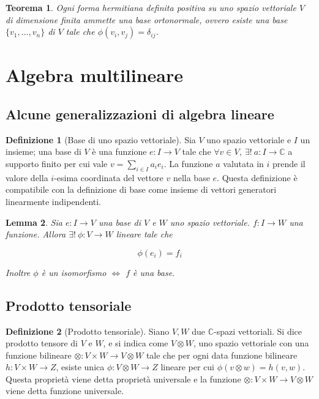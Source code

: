 \documentclass[11pt]{article}
\theoremstyle{plain}
\newtheorem{thm}{Teorema}[section]
\newtheorem{lemma}[thm]{Lemma}
\theoremstyle{definition}
\newtheorem{defn}{Definizione}[section]
\theoremstyle{remark}
\begin{document}
\begin{thm}
	Ogni forma hermitiana definita positiva su uno spazio vettoriale $V$ di dimensione finita ammette una \textit{base ortonormale}, ovvero esiste una base $\{v_1,\ldots,v_n\}$ di $V$ tale che $\phi(v_i,v_j)=\delta_{ij}$. 
\end{thm}




\newpage
\section{Algebra multilineare}
\subsection{Alcune generalizzazioni di algebra lineare}

\begin{defn}[Base di uno spazio vettoriale]
Sia $V$ uno spazio vettoriale e $I$ un insieme; una base di $V$ è una funzione $e: I \to V$ tale che 
$\forall v \in V,\  \exists!\  a: I \to \mathbb{C}$ a supporto finito per cui vale $v=\sum_{i\in I}a_i e_i$. La funzione $a$ 
valutata in $i$ prende il valore della $i$-esima coordinata del vettore $v$ nella base $e$. Questa definizione è compatibile con la 
definizione di base come insieme di vettori generatori linearmente indipendenti.
\end{defn}


\begin{lemma}
 Sia $e:I\to V$ una base di $V$ e $W$ uno spazio vettoriale. $f: I \to W$ una funzione. Allora $\exists!\  \phi: V \to W$ lineare tale che

\[\phi(e_i) = f_i \]

Inoltre $\phi$ è un isomorfismo $\Leftrightarrow$ $f$ è una base.
\end{lemma}


\subsection{Prodotto tensoriale}


  


\begin{defn}[Prodotto tensoriale]
   Siano $V, W$ due $\mathbb{C}$-spazi vettoriali. Si dice prodotto tensore di $V$ e $W$, 
   e si indica come $V\otimes W$, uno spazio vettoriale con una funzione bilineare 
   $\otimes: V \times W \to V\otimes W$ tale che per ogni data funzione bilineare $h: V\times W \to  Z$,
   esiste unica $\phi: V\otimes W \to Z$ lineare per cui $\phi(v \otimes w)=h(v,w)$.
   Questa proprietà viene detta proprietà universale e la funzione $\otimes: V \times W \to V\otimes W$
   viene detta funzione universale.



\label{defn:prodotto tensoriale}
\end{defn}
\end{document}

